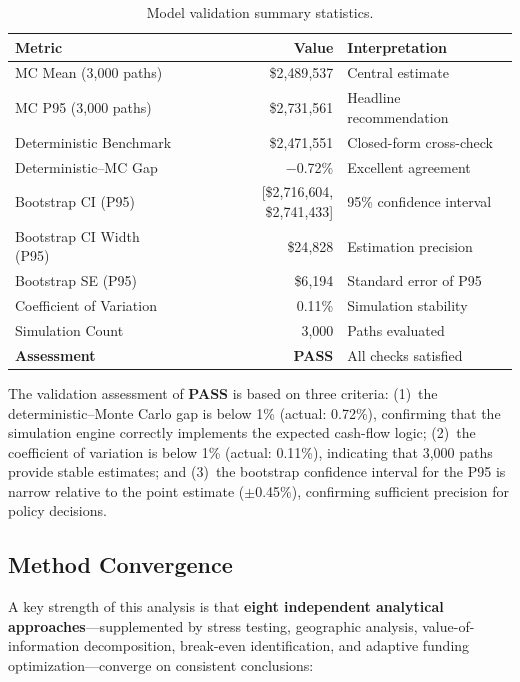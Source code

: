 \documentclass[11pt, letterpaper]{article}
\begin{document}
\begin{table}[H]
  \centering
  \caption{Model validation summary statistics.}
  \label{tab:validation}
  \begin{tabular}{@{}lrl@{}}
    \toprule
    \textbf{Metric} & \textbf{Value} & \textbf{Interpretation} \\
    \midrule
    MC Mean (3{,}000 paths) & \$2{,}489{,}537 & Central estimate \\
    MC P95 (3{,}000 paths) & \$2{,}731{,}561 & Headline recommendation \\
    Deterministic Benchmark & \$2{,}471{,}551 & Closed-form cross-check \\
    Deterministic--MC Gap & $-$0.72\% & Excellent agreement \\
    \midrule
    Bootstrap CI (P95) & [\$2{,}716{,}604, \$2{,}741{,}433] & 95\% confidence interval \\
    Bootstrap CI Width (P95) & \$24{,}828 & Estimation precision \\
    Bootstrap SE (P95) & \$6{,}194 & Standard error of P95 \\
    \midrule
    Coefficient of Variation & 0.11\% & Simulation stability \\
    Simulation Count & 3{,}000 & Paths evaluated \\
    \textbf{Assessment} & \textbf{PASS} & All checks satisfied \\
    \bottomrule
  \end{tabular}
\end{table}

The validation assessment of \textbf{PASS} is based on three criteria: (1)~the deterministic--Monte Carlo gap is below 1\% (actual: 0.72\%), confirming that the simulation engine correctly implements the expected cash-flow logic; (2)~the coefficient of variation is below 1\% (actual: 0.11\%), indicating that 3{,}000 paths provide stable estimates; and (3)~the bootstrap confidence interval for the P95 is narrow relative to the point estimate (${\pm}$0.45\%), confirming sufficient precision for policy decisions.

\subsection{Method Convergence}

A key strength of this analysis is that \textbf{eight independent analytical approaches}---supplemented by stress testing, geographic analysis, value-of-information decomposition, break-even identification, and adaptive funding optimization---converge on consistent conclusions:
\end{document}

